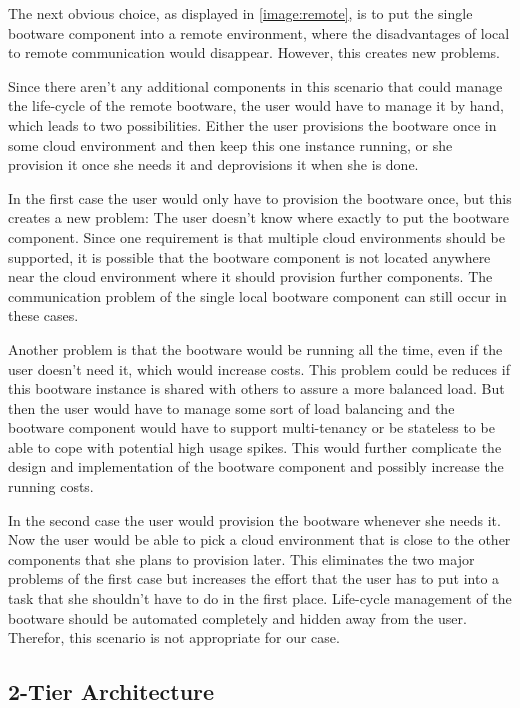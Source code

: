 The next obvious choice, as displayed in \autoref{image:remote}, is to put the single bootware component into a remote environment, where the disadvantages of local to remote communication would disappear.
However, this creates new problems.

Since there aren't any additional components in this scenario that could manage the life-cycle of the remote bootware, the user would have to manage it by hand, which leads to two possibilities.
Either the user provisions the bootware once in some cloud environment and then keep this one instance running, or she provision it once she needs it and deprovisions it when she is done.

In the first case the user would only have to provision the bootware once, but this creates a new problem: The user doesn't know where exactly to put the bootware component.
Since one requirement is that multiple cloud environments should be supported, it is possible that the bootware component is not located anywhere near the cloud environment where it should provision further components.
The communication problem of the single local bootware component can still occur in these cases.

Another problem is that the bootware would be running all the time, even if the user doesn't need it, which would increase costs.
This problem could be reduces if this bootware instance is shared with others to assure a more balanced load.
But then the user would have to manage some sort of load balancing and the bootware component would have to support multi-tenancy or be stateless to be able to cope with potential high usage spikes.
This would further complicate the design and implementation of the bootware component and possibly increase the running costs.

In the second case the user would provision the bootware whenever she needs it. Now the user would be able to pick a cloud environment that is close to the other components that she plans to provision later.
This eliminates the two major problems of the first case but increases the effort that the user has to put into a task that she shouldn't have to do in the first place.
Life-cycle management of the bootware should be automated completely and hidden away from the user.
Therefor, this scenario is not appropriate for our case.

\subsection{2-Tier Architecture}
\label{design:division:2tier}

